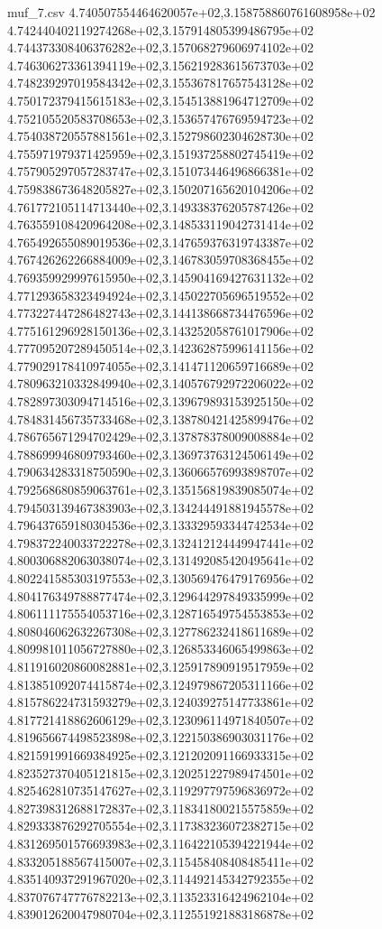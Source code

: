 \begin{filecontents*}{muf_7.csv}
4.740507554464620057e+02,3.158758860761608958e+02
4.742440402119274268e+02,3.157914805399486795e+02
4.744373308406376282e+02,3.157068279606974102e+02
4.746306273361394119e+02,3.156219283615673703e+02
4.748239297019584342e+02,3.155367817657543128e+02
4.750172379415615183e+02,3.154513881964712709e+02
4.752105520583708653e+02,3.153657476769594723e+02
4.754038720557881561e+02,3.152798602304628730e+02
4.755971979371425959e+02,3.151937258802745419e+02
4.757905297057283747e+02,3.151073446496866381e+02
4.759838673648205827e+02,3.150207165620104206e+02
4.761772105114713440e+02,3.149338376205787426e+02
4.763559108420964208e+02,3.148533119042731414e+02
4.765492655089019536e+02,3.147659376319743387e+02
4.767426262266884009e+02,3.146783059708368455e+02
4.769359929997615950e+02,3.145904169427631132e+02
4.771293658323494924e+02,3.145022705696519552e+02
4.773227447286482743e+02,3.144138668734476596e+02
4.775161296928150136e+02,3.143252058761017906e+02
4.777095207289450514e+02,3.142362875996141156e+02
4.779029178410974055e+02,3.141471120659716689e+02
4.780963210332849940e+02,3.140576792972206022e+02
4.782897303094714516e+02,3.139679893153925150e+02
4.784831456735733468e+02,3.138780421425899476e+02
4.786765671294702429e+02,3.137878378009008884e+02
4.788699946809793460e+02,3.136973763124506149e+02
4.790634283318750590e+02,3.136066576993898707e+02
4.792568680859063761e+02,3.135156819839085074e+02
4.794503139467383903e+02,3.134244491881945578e+02
4.796437659180304536e+02,3.133329593344742534e+02
4.798372240033722278e+02,3.132412124449947441e+02
4.800306882063038074e+02,3.131492085420495641e+02
4.802241585303197553e+02,3.130569476479176956e+02
4.804176349788877474e+02,3.129644297849335999e+02
4.806111175554053716e+02,3.128716549754553853e+02
4.808046062632267308e+02,3.127786232418611689e+02
4.809981011056727880e+02,3.126853346065499863e+02
4.811916020860082881e+02,3.125917890919517959e+02
4.813851092074415874e+02,3.124979867205311166e+02
4.815786224731593279e+02,3.124039275147733861e+02
4.817721418862606129e+02,3.123096114971840507e+02
4.819656674498523898e+02,3.122150386903031176e+02
4.821591991669384925e+02,3.121202091166933315e+02
4.823527370405121815e+02,3.120251227989474501e+02
4.825462810735147627e+02,3.119297797596836972e+02
4.827398312688172837e+02,3.118341800215575859e+02
4.829333876292705554e+02,3.117383236072382715e+02
4.831269501576693983e+02,3.116422105394221944e+02
4.833205188567415007e+02,3.115458408408485411e+02
4.835140937291967020e+02,3.114492145342792355e+02
4.837076747776782213e+02,3.113523316424962104e+02
4.839012620047980704e+02,3.112551921883186878e+02

\end{filecontents*}
